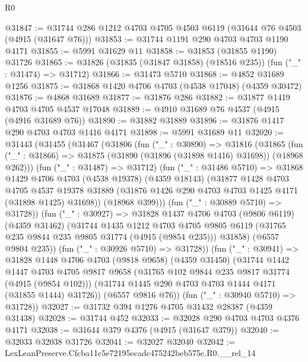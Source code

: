 \begin{lexlean}{R0}
\begin{coremodule}
@31847 := @31744 @286 @1212 @4703 @4705 @4503 @6119 (@31644 @76 @4503 (@4915 (@31647 @76)))
@31853 := @31744 @1191 @290 @4703 @4703 @1190 @4171
@31855 := @5991 @31629 @11
@31858 := @31853 (@31855 @1190) @31726
@31865 := @31826 (@31835 (@31847 @31858) (@18516 @235)) (fun ("_" : @31474) => @31712)
@31866 := @31473 @5710
@31868 := @4852 @31689 @1256
@31875 := @31868 @1420 @4706 @4703 (@4538 @17048) (@4359 @30472)
@31876 := @4868 @31689
@31877 := @31876 @286
@31882 := @31877 @1419 @4703 @4705 @4537 @17048
@31889 := @4910 @31689 @76 @4537 (@4915 (@4916 @31689 @76))
@31890 := @31882 @31889
@31896 := @31876 @1417 @290 @4703 @4703 @1416 @4171
@31898 := @5991 @31689 @11
@32020 := @31443
    (@31455
      (@31467
        (@31806
          (fun ("_" : @30890) =>
          @31816
            (@31865
              (fun ("_" : @31866) => @31875 (@31890 (@31896 (@31898 @1416) @31698)) (@18968 @262)))
            (fun ("_" : @31487) => @31712)
            (fun ("_" : @31486 @5710) =>
            @31868
              @1429
              @4706
              @4703
              (@4538 @19378)
              (@4359 @18143)
              (@31877
                @1428
                @4703
                @4705
                @4537
                @19378
                @31889
                (@31876 @1426 @290 @4703 @4703 @1425 @4171 (@31898 @1425) @31698))
              (@18968 @399)))
          (fun ("_" : @30889 @5710) => @31728))
        (fun ("_" : @30927) =>
        @31828
          @1437
          @4706
          @4703
          (@9806 @6119)
          (@4359 @31462)
          (@31744
            @1435
            @1212
            @4703
            @4705
            @9805
            @6119
            (@31765 @235 @9844 @235 @9805 @31774 (@4915 (@9854 @235)))
            @31858)
          (@6557 @9804 @235))
        (fun ("_" : @30926 @5710) => @31728))
      (fun ("_" : @30941) =>
      @31828
        @1448
        @4706
        @4703
        (@9818 @9658)
        (@4359 @31450)
        (@31744
          @1442
          @1447
          @4703
          @4705
          @9817
          @9658
          (@31765 @102 @9844 @235 @9817 @31774 (@4915 (@9854 @102)))
          (@31744 @1445 @290 @4703 @4703 @1444 @4171 (@31855 @1444) @31726))
        (@6557 @9816 @76))
      (fun ("_" : @30940 @5710) => @31728))
@32027 := @31732 @394 @1276 @4705 @31432 @28387 (@4359 @31438)
@32028 := @31744 @452
@32033 := @32028 @290 @4703 @4703 @4376 @4171
@32038 := @31644 @379 @4376 (@4915 (@31647 @379))
@32040 := @32033 @32038 @31726
@32041 := @32027 @32040
@32042 := LexLeanPreserve.Cfcba11c5e72195ecadc475242beb575c.R0.__rel_14

\end{coremodule}
\end{lexlean}
